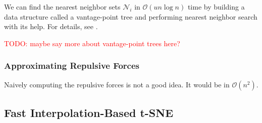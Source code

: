 We can find the nearest neighbor sets $\mathcal{N}_i$ in $\mathcal{O}(u n \log n)$ time by building a data structure called a vantage-point tree and performing nearest neighbor search with its help. For details, see \cite{vdMaa14}. 

\textcolor{red}{TODO: maybe say more about vantage-point trees here?}

\subsubsection{Approximating Repulsive Forces}
Naively computing the repulsive forces is not a good idea. It would be in $\mathcal{O}(n^2)$. 



\subsection{Fast Interpolation-Based t-SNE}